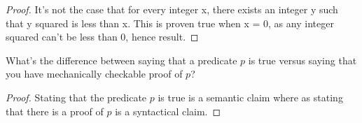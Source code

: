 \documentclass[12pt]{article}
\newenvironment{exercise}[2][Exercise]{\begin{trivlist}
\item[\hskip \labelsep {\bfseries #1}\hskip \labelsep {\bfseries #2.}]}{\end{trivlist}}
\begin{document}
\begin{proof}
It's not the case that for every integer x, there exists an integer y such that y squared is less than x. This is proven true when x = 0, as any integer squared can't be less than 0, hence result.  

\end{proof}

\begin{exercise}{5}
What's the difference between saying that a predicate $p$ is true versus saying that you have mechanically checkable proof of $p$?
\end{exercise}

\begin{proof} 
Stating that the predicate $p$ is true is a semantic claim where as stating that there is a proof of $p$ is a syntactical claim.

\end{proof}
\end{document}
